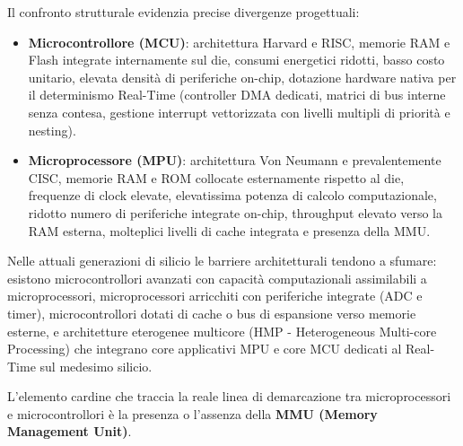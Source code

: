\newpage
Il confronto strutturale evidenzia precise divergenze progettuali:
\begin{itemize}
    \item \textbf{Microcontrollore (MCU)}: architettura Harvard e RISC, memorie RAM e Flash integrate internamente sul die, consumi energetici ridotti, basso costo unitario, elevata densità di periferiche on-chip, dotazione hardware nativa per il determinismo Real-Time (controller DMA dedicati, matrici di bus interne senza contesa, gestione interrupt vettorizzata con livelli multipli di priorità e nesting).
    \item \textbf{Microprocessore (MPU)}: architettura Von Neumann e prevalentemente CISC, memorie RAM e ROM collocate esternamente rispetto al die, frequenze di clock elevate, elevatissima potenza di calcolo computazionale, ridotto numero di periferiche integrate on-chip, throughput elevato verso la RAM esterna, molteplici livelli di cache integrata e presenza della MMU.
\end{itemize}

Nelle attuali generazioni di silicio le barriere architetturali tendono a sfumare: esistono microcontrollori avanzati con capacità computazionali assimilabili a microprocessori, microprocessori arricchiti con periferiche integrate (ADC e timer), microcontrollori dotati di cache o bus di espansione verso memorie esterne, e architetture eterogenee multicore (HMP - Heterogeneous Multi-core Processing) che integrano core applicativi MPU e core MCU dedicati al Real-Time sul medesimo silicio.

L'elemento cardine che traccia la reale linea di demarcazione tra microprocessori e microcontrollori è la presenza o l'assenza della \textbf{MMU (Memory Management Unit)}.


